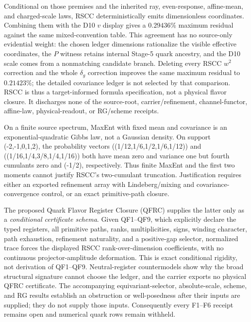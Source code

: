 \documentclass[11pt]{article}
\begin{document}
Conditional on those premises and the inherited ray, even-response, affine-mean, and charged-scale
laws, RSCC deterministically emits dimensionless coordinates.  Combining them with the D10
\(v\) display gives a \(0.29436\%\) maximum residual against the same mixed-convention table. This
agreement has no source-only evidential weight: the chosen ledger dimensions rationalize the visible
effective coordinates, the \(P\) witness retains internal Stage-5 quark ancestry, and the D10 scale
comes from a nonmatching candidate branch.  Deleting every RSCC \(w^2\) correction and
the whole \(\delta_g\) correction improves the same maximum residual to
\(0.21423\%\); the detailed covariance ledger is not selected by that comparison.  RSCC is thus a
target-informed formula specification, not a physical flavor closure. It
discharges none of the source-root, carrier/refinement, channel-functor, affine-law, physical-readout,
or RG/scheme receipts.

On a finite source spectrum, MaxEnt with fixed mean and covariance is an
exponential-quadratic Gibbs law, not a Gaussian density.  On support
({-2,-1,0,1,2}), the probability vectors
((1/12,1/6,1/2,1/6,1/12)) and
((1/16,1/4,3/8,1/4,1/16)) both have mean zero and variance one but fourth cumulants
zero and (-1/2), respectively.  Thus finite MaxEnt and the first two moments cannot justify
RSCC's two-cumulant truncation. Justification requires either an exported refinement
array with Lindeberg/mixing and covariance-convergence control, or an exact primitive-path closure.

The proposed Quark Flavor Register Closure (QFRC) supplies the latter only as a
\emph{conditional certificate schema}.  Given QF1--QF9, which explicitly declare the typed
registers, all primitive paths, ranks, multiplicities, signs, winding character, path exhaustion,
refinement naturality, and a positive-gap selector, normalized trace forces the displayed RSCC
rank-over-dimension coefficients, with no continuous projector-amplitude deformation.  This is
exact conditional rigidity, not derivation of QF1--QF9.  Neutral-register countermodels show why
the broad structural signature cannot choose the ledger, and the carrier exports no
physical QFRC certificate.  The accompanying equivariant-selector, absolute-scale, scheme, and RG
results establish an obstruction or well-posedness after their inputs are supplied;
they do not supply those inputs.  Consequently every F1--F6 receipt remains open and numerical
quark rows remain withheld.
\end{document}
